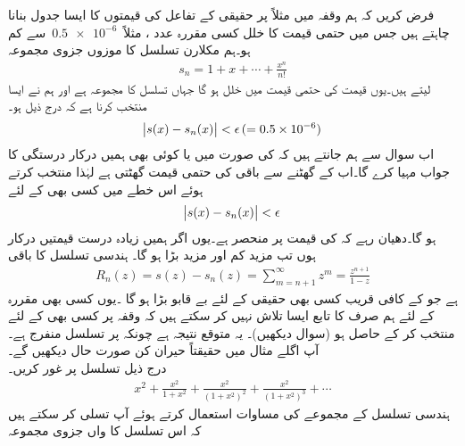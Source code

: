 \quad
فرض کریں کہ ہم وقفہ  میں مثلاً  پر حقیقی  کے تفاعل  کی قیمتوں کا ایسا جدول بنانا چاہتے ہیں جس میں حتمی قیمت کا خلل کسی مقررہ عدد ، مثلاً 
$\,\num{0.5e-6}\,$
 سے کم ہو۔ہم مکلارن تسلسل کا موزوں جزوی مجموعہ
\begin{align*}
s_n=1+x+\cdots+\frac{x^n}{n!}
\end{align*}
لیتے ہیں۔یوں قیمت کی حتمی قیمت میں خلل  ہو گا جہاں  تسلسل کا مجموعہ ہے اور ہم نے ایسا  منتخب کرنا ہے کہ درج ذیل ہو۔
\begin{align*}
\abs{s(x)-s_n(x)}<\epsilon\,(=\num{0.5e-6})
\end{align*}
اب سوال  سے ہم جانتے ہیں کہ  کی صورت میں  یا  کوئی بھی  ہمیں درکار درستگی کا جواب مہیا کرے گا۔اب  کے گھٹنے سے باقی کی حتمی قیمت  گھٹتی ہے لہٰذا  منتخب کرتے ہوئے اس خطے میں  کسی بھی  کے لئے
\begin{align*}
\abs{s(x)-s_n(x)}<\epsilon 
\end{align*}
ہو گا۔دھیان رہے کہ  کی قیمت  پر منحصر ہے۔یوں اگر ہمیں زیادہ درست قیمتیں درکار ہوں تب  مزید کم اور  مزید بڑا ہو گا۔
\quad
ہندسی تسلسل  کا باقی
\begin{align*}
R_n(z)=s(z)-s_n(z)=\sum\limits_{m=n+1}^{\infty} z^m=\frac{z^{n+1}}{1-z}
\end{align*}
ہے جو  کے کافی قریب کسی بھی حقیقی  کے لئے بے قابو بڑا ہو گا ۔یوں کسی بھی مقررہ  کے لئے ہم صرف  کا تابع ایسا  تلاش نہیں کر سکتے ہیں کہ  وقفہ  پر کسی بھی  کے لئے  منتخب کر کے  حاصل ہو (سوال  دیکھیں)۔ یہ متوقع نتیجہ  ہے چونکہ  پر تسلسل منفرج ہے۔آپ اگلے مثال میں حقیقتاً حیران کن صورت حال دیکھیں گے۔
\quad \\
درج ذیل تسلسل پر غور کریں۔
\begin{align*}
x^2+\frac{x^2}{1+x^2}+\frac{x^2}{(1+x^2)^2}+\frac{x^2}{(1+x^2)^3}+\cdots
\end{align*}
ہندسی تسلسل کے مجموعے کی مساوات استعمال کرتے ہوئے آپ تسلی کر سکتے ہیں کہ اس تسلسل کا  واں جزوی مجموعہ 
